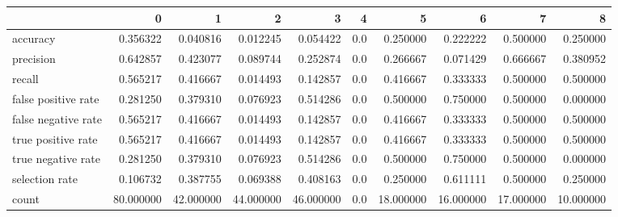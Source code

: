 \begin{tabular}{lrrrrrrrrr}
\toprule
{} &          0 &          1 &          2 &          3 &    4 &          5 &          6 &          7 &          8 \\
\midrule
accuracy            &   0.356322 &   0.040816 &   0.012245 &   0.054422 &  0.0 &   0.250000 &   0.222222 &   0.500000 &   0.250000 \\
precision           &   0.642857 &   0.423077 &   0.089744 &   0.252874 &  0.0 &   0.266667 &   0.071429 &   0.666667 &   0.380952 \\
recall              &   0.565217 &   0.416667 &   0.014493 &   0.142857 &  0.0 &   0.416667 &   0.333333 &   0.500000 &   0.500000 \\
false positive rate &   0.281250 &   0.379310 &   0.076923 &   0.514286 &  0.0 &   0.500000 &   0.750000 &   0.500000 &   0.000000 \\
false negative rate &   0.565217 &   0.416667 &   0.014493 &   0.142857 &  0.0 &   0.416667 &   0.333333 &   0.500000 &   0.500000 \\
true positive rate  &   0.565217 &   0.416667 &   0.014493 &   0.142857 &  0.0 &   0.416667 &   0.333333 &   0.500000 &   0.500000 \\
true negative rate  &   0.281250 &   0.379310 &   0.076923 &   0.514286 &  0.0 &   0.500000 &   0.750000 &   0.500000 &   0.000000 \\
selection rate      &   0.106732 &   0.387755 &   0.069388 &   0.408163 &  0.0 &   0.250000 &   0.611111 &   0.500000 &   0.250000 \\
count               &  80.000000 &  42.000000 &  44.000000 &  46.000000 &  0.0 &  18.000000 &  16.000000 &  17.000000 &  10.000000 \\
\bottomrule
\end{tabular}
